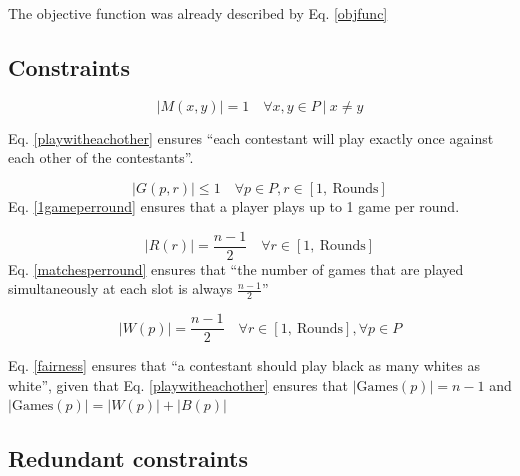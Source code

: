 \documentclass[a4paper, 10pt]{article}
\begin{document}
The objective function was already described by Eq. \ref{objfunc}

\subsection{Constraints}

\begin{equation}
    \label{playwitheachother}
    |M(x,y)| = 1 \quad \forall x,y \in P \ | \  x \neq y
\end{equation}

Eq. \ref{playwitheachother} ensures ``each contestant will play exactly once against each other of the contestants''.


\begin{equation}
    \label{1gameperround}
    |G(p,r)| \leq 1 \quad \forall p \in P, r \in [1, \ \text{Rounds}] 
\end{equation}
Eq. \ref{1gameperround} ensures that a player plays up to 1 game per round.

\begin{equation}
    \label{matchesperround}
    |R(r)| = \frac{n-1}{2}  \quad \forall r \in [1,\ \text{Rounds}] 
\end{equation}
Eq. \ref{matchesperround} ensures that ``the number of games that are played simultaneously at each slot is always $\frac{n-1}{2}$''

\begin{equation}
    \label{fairness}
    |W(p)| = \frac{n-1}{2} \quad \forall r \in [1, \ \text{Rounds}], \forall p \in P
\end{equation}

Eq. \ref{fairness} ensures that ``a contestant should play black as many whites as white'', 
given that Eq. \ref{playwitheachother} ensures that $|\text{Games}(p)| = n - 1$ and $|\text{Games}(p)| = |W(p)| + |B(p)|$  

\subsection{Redundant constraints}
\end{document}
